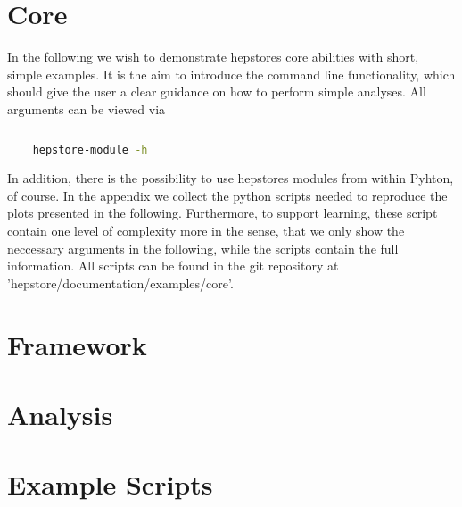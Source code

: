 

\chapter{Core}

In the following we wish to demonstrate hepstores core abilities with
short, simple examples. It is the aim to introduce the command line
functionality, which should give the user a clear guidance on how to
perform simple analyses. All arguments can be viewed via
%
\begin{changemargin}{1.5cm}{1.5cm} 
  \begin{lstlisting}[language=Bash]
    
    hepstore-module -h
  \end{lstlisting}
\end{changemargin}
%
In addition, there is the possibility to use hepstores modules from
within Pyhton, of course. In the appendix we collect the python
scripts needed to reproduce the plots presented in the
following. Furthermore, to support learning, these script contain one
level of complexity more in the sense, that we only show the
neccessary arguments in the following, while the scripts contain the
full information. All scripts can be found in the git repository at
'hepstore/documentation/examples/core'.






\chapter{Framework}



\chapter{Analysis}




\chapter{Example Scripts}

